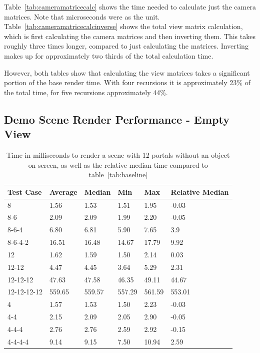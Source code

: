 Table~\ref{tab:cameramatricecalc} shows the time needed to calculate just the camera matrices. Note that microseconds were as the unit. Table~\ref{tab:cameramatricecalcinverse} shows the total view matrix calculation, which is first calculating the camera matrices and then inverting them. This takes roughly three times longer, compared to just calculating the matrices. Inverting makes up for approximately two thirds of the total calculation time.

However, both tables show that calculating the view matrices takes a significant portion of the base render time. With four recursions it is approximately 23\% of the total time, for five recursions approximately 44\%. 

\subsection{Demo Scene Render Performance - Empty View}


\begin{table}[H]
	\centering
	\begin{tabular}{|l|l|l|l|l|l|}
		\hline
		Test Case   & Average & Median & Min    & Max    & Relative Median \\ \hline
		8           & 1.56    & 1.53   & 1.51   & 1.95   & -0.03           \\ \hline
		8-6         & 2.09    & 2.09   & 1.99   & 2.20   & -0.05           \\ \hline
		8-6-4       & 6.80    & 6.81   & 5.90   & 7.65   & 3.9             \\ \hline
		8-6-4-2     & 16.51   & 16.48  & 14.67  & 17.79  & 9.92            \\ \hline
		12          & 1.62    & 1.59   & 1.50   & 2.14   & 0.03            \\ \hline
		12-12       & 4.47    & 4.45   & 3.64   & 5.29   & 2.31            \\ \hline
		12-12-12    & 47.63   & 47.58  & 46.35  & 49.11  & 44.67           \\ \hline
		12-12-12-12 & 559.65  & 559.57 & 557.29 & 561.59 & 553.01          \\ \hline
		4           & 1.57    & 1.53   & 1.50   & 2.23   & -0.03           \\ \hline
		4-4         & 2.15    & 2.09   & 2.05   & 2.90   & -0.05           \\ \hline
		4-4-4       & 2.76    & 2.76   & 2.59   & 2.92   & -0.15           \\ \hline
		4-4-4-4     & 9.14    & 9.15   & 7.50   & 10.94  & 2.59            \\ \hline
	\end{tabular}
	\caption{Time in milliseconds to render a scene with 12 portals without an object on screen, as well as the relative median time compared to table~\ref{tab:baseline}}
	\label{tab:rendernothing}
\end{table}


